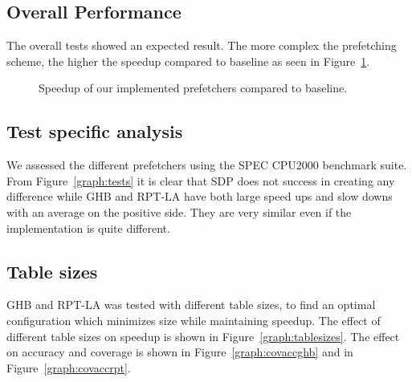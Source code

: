\subsection{Overall Performance}
The overall tests showed an expected result. The more complex the prefetching
scheme, the higher the speedup compared to baseline as seen in
Figure~\ref{graph:base}. 
\begin{figure}[h]
    \caption{Speedup of our implemented prefetchers compared to baseline.}
    \label{graph:base}
\end{figure}

\subsection{Test specific analysis}
We assessed the different prefetchers using the SPEC CPU2000 benchmark suite.
From Figure~\ref{graph:tests} it is clear that SDP does not success in creating
any difference while GHB and RPT-LA have both large speed ups and slow downs with
an average on the positive side. They are very similar even if the
implementation is quite different.

\subsection{Table sizes}
GHB and RPT-LA was tested with different table sizes, to find an optimal
configuration which minimizes size while maintaining speedup. The
effect of different table sizes on speedup is shown in
Figure~\ref{graph:tablesizes}. The effect on accuracy and coverage is
shown in Figure~\ref{graph:covaccghb} and in Figure~\ref{graph:covaccrpt}.

